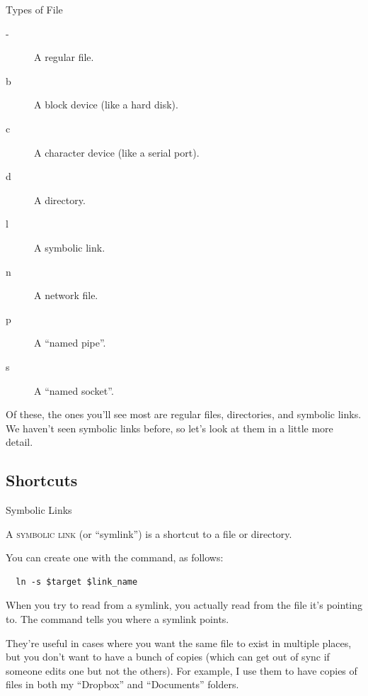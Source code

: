 \begin{frame}[fragile]{Types of File}

  \begin{description}
    \item[-] A regular file.
    \item[b] A block device (like a hard disk).
    \item[c] A character device (like a serial port).
    \item[d] A directory.
    \item[l] A symbolic link.
    \item[n] A network file.
    \item[p] A \enquote{named pipe}.
    \item[s] A \enquote{named socket}.
  \end{description}

\end{frame}

Of these, the ones you'll see most are regular files, directories, and symbolic
links.  We haven't seen symbolic links before, so let's look at them in a
little more detail.

\subsection{Shortcuts}

\begin{frame}[fragile]{Symbolic Links}
  \begin{definition}[symlink]
    A \textsc{symbolic link} (or \enquote{symlink}) is a shortcut to a file or
    directory.
  \end{definition}

  \pause

  You can create one with the  command, as follows:
  \begin{verbatim}
  ln -s $target $link_name
  \end{verbatim}

  \pause

  When you try to read from a symlink, you actually read from the file it's
  pointing to.  The  command tells you where a symlink points.
  
   {
    They're useful in cases where you want the same file to exist in multiple
    places, but you don't want to have a bunch of copies (which can get out of
    sync if someone edits one but not the others).  For example, I use them to
    have copies of files in both my \enquote{Dropbox} and \enquote{Documents}
    folders.
  }
\end{frame}


